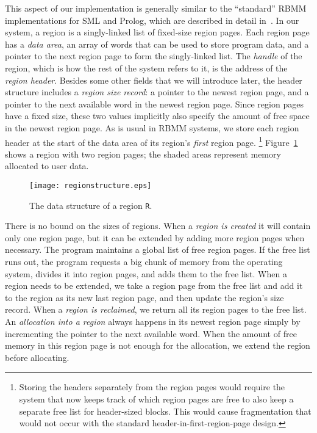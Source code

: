 \documentclass{tlp}
\newcommand{\code}[1]{{\tt#1}}
\begin{document}
This aspect of our implementation is generally similar to
the ``standard'' RBMM implementations for SML and Prolog,
which are described in detail in~\cite{Makholm00,Makholm00master}.
In our system, a region is a singly-linked list of fixed-size region pages.
Each region page has a \emph{data area},
an array of words that can be used to store program data,
and a pointer to the next region page to form the singly-linked list.
The \emph{handle} of the region,
which is how the rest of the system refers to it,
is the address of the \emph{region header}.
Besides some other fields that we will introduce later,
the header structure includes a \emph{region size record}:
a pointer to the newest region page,
and a pointer to the next available word in the newest region page.
Since region pages have a fixed size,
these two values implicitly also specify
the amount of free space in the newest region page.
As is usual in RBMM systems, we store each region header
at the start of the data area of its region's \emph{first} region page.
\footnote{
Storing the headers separately from the region pages
would require the system that now keeps track of which region pages are free
to also keep a separate free list for header-sized blocks.
This would cause fragmentation that would not occur
with the standard header-in-first-region-page design.
}
Figure~\ref{fig:regionstructure} shows a region with two region pages;
the shaded areas represent memory allocated to user data.

\begin{figure}[htp]
    \centering
    \texttt{[image: regionstructure.eps]}
    \small
    \caption{The data structure of a region \code{R}.}
    \normalsize
    \label{fig:regionstructure}
\end{figure}

There is no bound on the sizes of regions.
When a \emph{region is created} it will contain only one region page,
but it can be extended by adding more region pages when necessary.
The program maintains a global list of free region pages.
If the free list runs out,
the program requests a big chunk of memory from the operating system,
divides it into region pages, and adds them to the free list.
When a region needs to be extended,
we take a region page from the free list
and add it to the region as its new last region page,
and then update the region's size record.
When a \emph{region is reclaimed},
we return all its region pages to the free list.
An \emph{allocation into a region} always happens in its newest region page
simply by incrementing the pointer to the next available word.
When the amount of free memory in this region page
is not enough for the allocation,
we extend the region before allocating.
\end{document}

